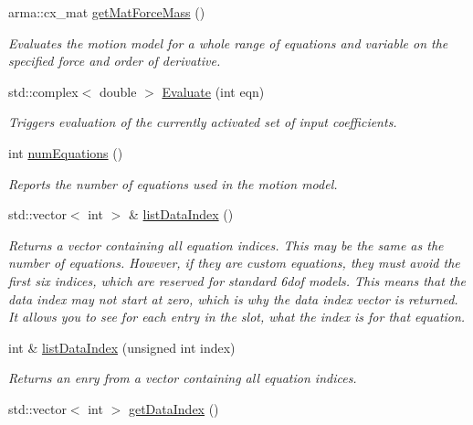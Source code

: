 \begin{DoxyCompactItemize}
arma\-::cx\-\_\-mat \hyperlink{classosea_1_1ofreq_1_1_motion_model_a7215db9f6f0c3e79f4559a4b9eadbcfc}{get\-Mat\-Force\-Mass} ()
\begin{DoxyCompactList}\small\item\em Evaluates the motion model for a whole range of equations and variable on the specified force and order of derivative. \end{DoxyCompactList}\item 
std\-::complex$<$ double $>$ \hyperlink{classosea_1_1ofreq_1_1_motion_model_a331d96a45df8ca0911fc4610705c3a30}{Evaluate} (int eqn)
\begin{DoxyCompactList}\small\item\em Triggers evaluation of the currently activated set of input coefficients. \end{DoxyCompactList}\item 
int \hyperlink{classosea_1_1ofreq_1_1_motion_model_a0a228c24a524e2a1c6636d3121a842be}{num\-Equations} ()
\begin{DoxyCompactList}\small\item\em Reports the number of equations used in the motion model. \end{DoxyCompactList}\item 
std\-::vector$<$ int $>$ \& \hyperlink{classosea_1_1ofreq_1_1_motion_model_af9e72eac109b2d1bff50bb8759f113c3}{list\-Data\-Index} ()
\begin{DoxyCompactList}\small\item\em Returns a vector containing all equation indices. This may be the same as the number of equations. However, if they are custom equations, they must avoid the first six indices, which are reserved for standard 6dof models. This means that the data index may not start at zero, which is why the data index vector is returned. It allows you to see for each entry in the slot, what the index is for that equation. \end{DoxyCompactList}\item 
int \& \hyperlink{classosea_1_1ofreq_1_1_motion_model_ab9c11dbb141ed78daa137d562b4409a7}{list\-Data\-Index} (unsigned int index)
\begin{DoxyCompactList}\small\item\em Returns an enry from a vector containing all equation indices. \end{DoxyCompactList}\item 
std\-::vector$<$ int $>$ \hyperlink{classosea_1_1ofreq_1_1_motion_model_a19f38af161556e9e5b79cdf6a4ff39bb}{get\-Data\-Index} ()

\end{DoxyCompactItemize}
